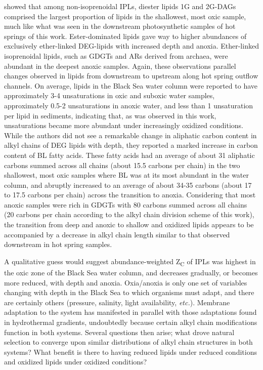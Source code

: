 \cite{schroder2015intact} showed that among non-isoprenoidal IPLs, diester lipids 1G and 2G-DAGs comprised the largest proportion of lipids in the shallowest, most oxic sample, much like what was seen in the downstream photosynthetic samples of hot springs of this work. Ester-dominated lipids gave way to higher abundances of exclusively ether-linked DEG-lipids with increased depth and anoxia. Ether-linked isoprenoidal lipids, such as GDGTs and ARs derived from archaea, were abundant in the deepest anoxic samples. Again, these observations parallel changes observed in lipids from downstream to upstream along hot spring outflow channels. On average, lipids in the Black Sea water column were reported to have approximately 3-4 unsaturations in oxic and suboxic water samples, approximately 0.5-2 unsaturations in anoxic water, and less than 1 unsaturation per lipid in sediments, indicating that, as was observed in this work, unsaturations became more abundant under increasingly oxidized conditions. While the authors did not see a remarkable change in aliphatic carbon content in alkyl chains of DEG lipids with depth, they reported a marked increase in carbon content of BL fatty acids. These fatty acids had an average of about 31 aliphatic carbons summed across all chains (about 15.5 carbons per chain) in the two shallowest, most oxic samples where BL was at its most abundant in the water column, and abruptly increased to an average of about 34-35 carbons (about 17 to 17.5 carbons per chain) across the transition to anoxia. Considering that most anoxic samples were rich in GDGTs with 80 carbons summed across all chains (20 carbons per chain according to the alkyl chain division scheme of this work), the transition from deep and anoxic to shallow and oxidized lipids appears to be accompanied by a decrease in alkyl chain length similar to that observed downstream in hot spring samples.

A qualitative guess would suggest abundance-weighted Z\textsubscript{C} of IPLs was highest in the oxic zone of the Black Sea water column, and decreases gradually, or becomes more reduced, with depth and anoxia. Oxia/anoxia is only one set of variables changing with depth in the Black Sea to which organisms must adapt, and there are certainly others (pressure, salinity, light availability, \textit{etc.}). Membrane adaptation to the system has manifested in parallel with those adaptations found in hydrothermal gradients, undoubtedly because certain alkyl chain modifications function in both systems. Several questions then arise; what drove natural selection to converge upon similar distributions of alkyl chain structures in both systems? What benefit is there to having reduced lipids under reduced conditions and oxidized lipids under oxidized conditions?

